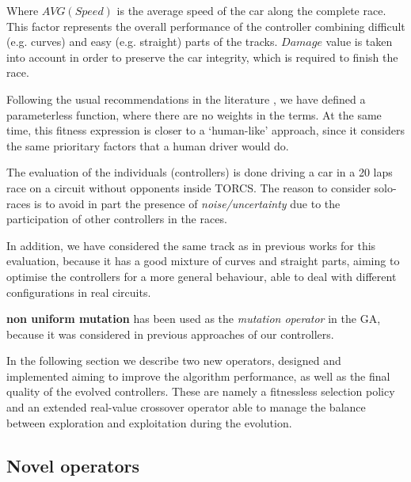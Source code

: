 \documentclass[10pt,journal,compsoc]{IEEEtran}
\begin{document}
Where $AVG(Speed)$ is the average speed of the car along the complete race. This factor represents the overall performance of the controller combining difficult (e.g. curves) and easy (e.g. straight) parts of the tracks. $Damage$ value is taken into account in order to preserve the car integrity, which is required to finish the race.

Following the usual recommendations in the literature \cite{Harik-ParameterLess99}, we have defined a parameterless function, where there are no weights in the terms.
At the same time, this fitness expression is closer to a `human-like' approach, since it considers the same prioritary factors that a human driver would do.

The evaluation of the individuals (controllers) is done driving a car in a 20 laps race on a circuit without opponents inside TORCS. The reason to consider solo-races is to avoid in part the presence of \textit{noise/uncertainty} due to the participation of other controllers \cite{merelo2016statistical} in the races.

In addition, we have considered the same track as in previous works
\cite{salem_cig2018} for this evaluation, because it has a good mixture of 
curves and straight parts, aiming to optimise the controllers for a more general behaviour, able to deal with different configurations in real circuits.

\textbf{non uniform mutation} \cite{mutation1997} has been used as the \textit{mutation operator} in the GA, because it was considered in previous approaches of our controllers. 

In the following section we describe two new operators, designed and implemented aiming to improve the algorithm performance, as well as the final quality of the evolved controllers. These are namely a fitnessless selection policy and an extended real-value crossover operator able to manage the balance between exploration and exploitation during the evolution.

\subsection{Novel operators}
\label{subsec:novel_operators}

\end{document}
